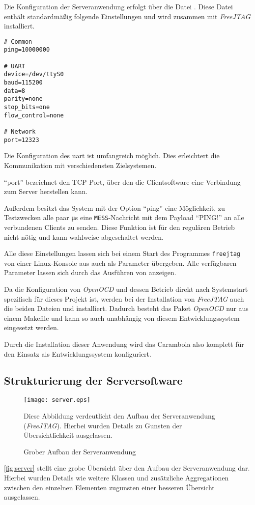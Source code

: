 Die Konfiguration der Serveranwendung erfolgt über die Datei
. Diese Datei enthält standardmäßig folgende
Einstellungen und wird zusammen mit \emph{FreeJTAG} installiert.
\begin{lstlisting}
# Common
ping=10000000

# UART
device=/dev/ttyS0
baud=115200
data=8
parity=none
stop_bits=one
flow_control=none

# Network
port=12323
\end{lstlisting}

Die Konfiguration des \gls{uart} ist umfangreich möglich. Dies erleichtert
die Kommunikation mit verschiedensten Zielsystemen.

"`port"' bezeichnet den TCP-Port, über den die Clientsoftware eine
Verbindung zum Server herstellen kann.

Außerdem besitzt das System mit der Option "`ping"' eine Möglichkeit, zu
Testzwecken alle paar \si{\us} eine \texttt{MESS}-Nachricht mit dem Payload
"`PING!"' an alle verbundenen Clients zu senden. Diese Funktion ist für den
regulären Betrieb nicht nötig und kann wahlweise abgeschaltet werden.

Alle diese Einstellungen lassen sich bei einem Start des Programmes
\texttt{freejtag} von einer Linux-Konsole aus auch als Parameter
übergeben. Alle verfügbaren Parameter lassen sich durch das Ausführen von
 anzeigen.

Da die Konfiguration von \emph{OpenOCD} und dessen Betrieb direkt nach
Systemstart spezifisch für dieses Projekt ist, werden bei der Installation von
\emph{FreeJTAG} auch die beiden Dateien  und
 installiert. Dadurch besteht das Paket
\emph{OpenOCD} nur aus einem Makefile und kann so auch unabhängig von diesem
Entwicklungssystem eingesetzt werden.

Durch die Installation dieser Anwendung wird das Carambola also komplett für den
Einsatz als Entwicklungssystem konfiguriert.

\subsection{Strukturierung der Serversoftware}
\begin{figure}[!ht]
\centering
\texttt{[image: server.eps]}
\caption{Grober Aufbau der Serveranwendung}{Diese Abbildung verdeutlicht den
Aufbau der Serveranwendung (\emph{FreeJTAG}). Hierbei wurden Details zu Gunsten der
Übersichtlichkeit ausgelassen.}
\label{fig:server}
\end{figure}
\autoref{fig:server} stellt eine grobe Übersicht über den Aufbau der
Serveranwendung dar. Hierbei wurden Details wie weitere Klassen und
zusätzliche Aggregationen zwischen den einzelnen Elementen zugunsten einer
besseren Übersicht ausgelassen.


